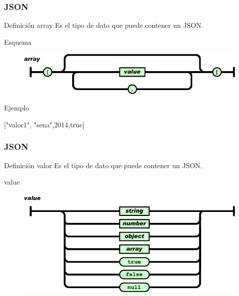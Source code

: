 \documentclass{beamer}
\begin{document}

\begin{frame}
\frametitle{JSON}
\begin{block}{Definici\'on array}
 Es el tipo de dato que puede contener un JSON.
\end{block}

\begin{block}{Esquema}
\begin{figure}
\includegraphics[width=0.7\linewidth]{array.png}
\end{figure}
\end{block}

\begin{block}{Ejemplo}
\begin{center}
["valor1", "sena",2014,true]
\end{center}
\end{block}

\end{frame}


\begin{frame}
\frametitle{JSON}
\begin{block}{Definici\'on valor}
 Es el tipo de dato que puede contener un JSON.
\end{block}

\begin{block}{value}
\begin{figure}
\includegraphics[width=0.7\linewidth]{value.png}
\end{figure}
\end{block}

\end{frame}

\end{document}
